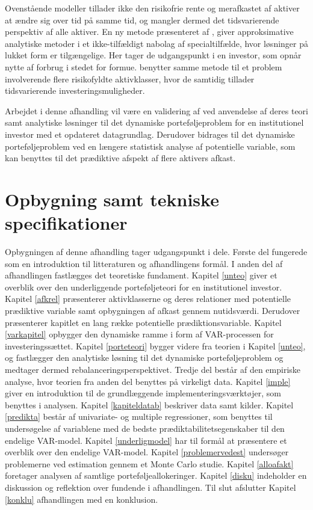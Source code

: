 \documentclass[
  a4paper,
  oneside]{memoir}
\begin{document}
Ovenstående modeller tillader ikke den risikofrie rente og merafkastet af aktiver at ændre sig over tid på samme tid, og mangler dermed det tidsvarierende perspektiv af alle aktiver. En ny metode præsenteret af \citep{CampVic1999, CampVic2001, CampVic2003}, giver approksimative analytiske metoder i et ikke-tilfældigt nabolag af specialtilfælde, hvor løsninger på lukket form er tilgængelige. Her tager de udgangspunkt i en investor, som opnår nytte af forbrug i stedet for formue. \citep{CampVicCha2003} benytter samme metode til et problem involverende flere risikofyldte aktivklasser, hvor de samtidig tillader tidsvarierende investeringsmuligheder.

Arbejdet i denne afhandling vil være en validering af \citep{JurVic2011} ved anvendelse af deres teori samt analytiske løsninger til det dynamiske porteføljeproblem for en institutionel investor med et opdateret datagrundlag. Derudover bidrages til det dynamiske porteføljeproblem ved en længere statistisk analyse af potentielle variable, som kan benyttes til det prædiktive afspekt af flere aktivers afkast.

\hypertarget{opbygning-samt-tekniske-specifikationer}{%
\section{Opbygning samt tekniske specifikationer}\label{opbygning-samt-tekniske-specifikationer}}

Opbygningen af denne afhandling tager udgangspunkt i dele. Første del fungerede som en introduktion til litteraturen og afhandlingens formål. I anden del af afhandlingen fastlægges det teoretiske fundament. Kapitel \ref{unteo} giver et overblik over den underliggende porteføljeteori for en institutionel investor. Kapitel \ref{afkrel} præsenterer aktivklasserne og deres relationer med potentielle prædiktive variable samt opbygningen af afkast gennem nutidsværdi. Derudover præsenterer kapitlet en lang række potentielle prædiktionsvariable. Kapitel \ref{varkapitel} opbygger den dynamiske ramme i form af VAR-processen for investeringssættet. Kapitel \ref{porteteori} bygger videre fra teorien i Kapitel \ref{unteo}, og fastlægger den analytiske løsning til det dynamiske porteføljeproblem og medtager dermed rebalanceringsperspektivet. Tredje del består af den empiriske analyse, hvor teorien fra anden del benyttes på virkeligt data. Kapitel \ref{imple} giver en introduktion til de grundlæggende implementeringsværktøjer, som benyttes i analysen. Kapitel \ref{kapiteldatab} beskriver data samt kilder. Kapitel \ref{predikta} består af univariate- og multiple regressioner, som benyttes til undersøgelse af variablene med de bedste prædiktabilitetsegenskaber til den endelige VAR-model. Kapitel \ref{underligmodel} har til formål at præsentere et overblik over den endelige VAR-model. Kapitel \ref{problemervedest} undersøger problemerne ved estimation gennem et Monte Carlo studie. Kapitel \ref{alloafakt} foretager analysen af samtlige porteføljeallokeringer. Kapitel \ref{disku} indeholder en diskussion og reflektion over fundende i afhandlingen. Til slut afslutter Kapitel \ref{konklu} afhandlingen med en konklusion.
\end{document}
